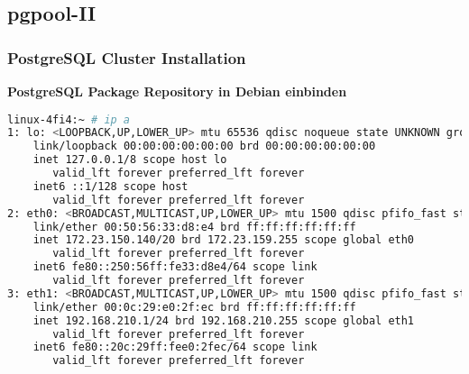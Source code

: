 
\subsection{pgpool-II}
\subsubsection{\Gls{PostgreSQL Cluster} Installation}
\textbf{\Gls{PostgreSQL} Package Repository in Debian einbinden}
\lstset{style=gra_codestyle}
\begin{lstlisting}[language=bash, caption=\gls{openSUSE} - Netzwerk Settings,captionpos=b,label={lst:opensuse-network-setting},breaklines=true]
linux-4fi4:~ # ip a
1: lo: <LOOPBACK,UP,LOWER_UP> mtu 65536 qdisc noqueue state UNKNOWN group default qlen 1
    link/loopback 00:00:00:00:00:00 brd 00:00:00:00:00:00
    inet 127.0.0.1/8 scope host lo
       valid_lft forever preferred_lft forever
    inet6 ::1/128 scope host
       valid_lft forever preferred_lft forever
2: eth0: <BROADCAST,MULTICAST,UP,LOWER_UP> mtu 1500 qdisc pfifo_fast state UP group default qlen 1000
    link/ether 00:50:56:33:d8:e4 brd ff:ff:ff:ff:ff:ff
    inet 172.23.150.140/20 brd 172.23.159.255 scope global eth0
       valid_lft forever preferred_lft forever
    inet6 fe80::250:56ff:fe33:d8e4/64 scope link
       valid_lft forever preferred_lft forever
3: eth1: <BROADCAST,MULTICAST,UP,LOWER_UP> mtu 1500 qdisc pfifo_fast state UP group default qlen 1000
    link/ether 00:0c:29:e0:2f:ec brd ff:ff:ff:ff:ff:ff
    inet 192.168.210.1/24 brd 192.168.210.255 scope global eth1
       valid_lft forever preferred_lft forever
    inet6 fe80::20c:29ff:fee0:2fec/64 scope link
       valid_lft forever preferred_lft forever
\end{lstlisting}